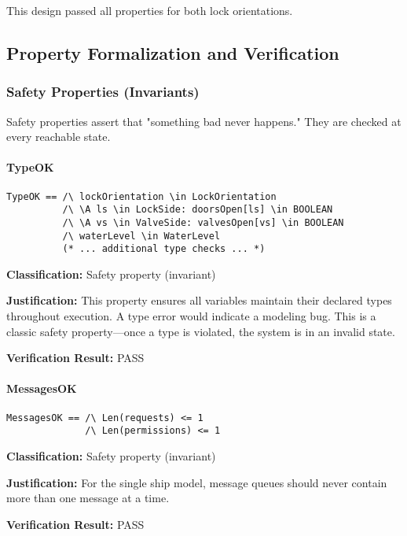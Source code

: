 \documentclass[12pt,a4paper]{article}
\begin{document}
This design passed all properties for both lock orientations.

\newpage
\subsection{Property Formalization and Verification}

\subsubsection{Safety Properties (Invariants)}

Safety properties assert that "something bad never happens." They are checked at every reachable state.

\paragraph{TypeOK}
\begin{lstlisting}[style=tlaplus]
TypeOK == /\ lockOrientation \in LockOrientation
          /\ \A ls \in LockSide: doorsOpen[ls] \in BOOLEAN
          /\ \A vs \in ValveSide: valvesOpen[vs] \in BOOLEAN
          /\ waterLevel \in WaterLevel
          (* ... additional type checks ... *)
\end{lstlisting}

\textbf{Classification:} Safety property (invariant)

\textbf{Justification:} This property ensures all variables maintain their declared types throughout execution. A type error would indicate a modeling bug. This is a classic safety property---once a type is violated, the system is in an invalid state.

\textbf{Verification Result:} \checkmark{} PASS

\paragraph{MessagesOK}
\begin{lstlisting}[style=tlaplus]
MessagesOK == /\ Len(requests) <= 1
              /\ Len(permissions) <= 1
\end{lstlisting}

\textbf{Classification:} Safety property (invariant)

\textbf{Justification:} For the single ship model, message queues should never contain more than one message at a time.

\textbf{Verification Result:} \checkmark{} PASS
\end{document}
